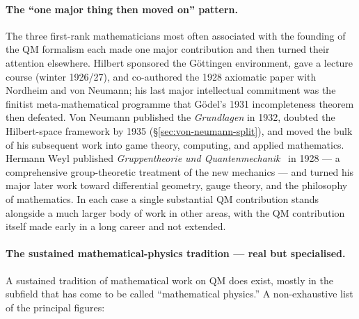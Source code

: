 \paragraph{The ``one major thing then moved on'' pattern.}
The three first-rank mathematicians most often associated with the founding of the QM formalism each made one major contribution and then turned their attention elsewhere. Hilbert sponsored the Göttingen environment, gave a lecture course (winter 1926/27), and co-authored the 1928 axiomatic paper with Nordheim and von Neumann; his last major intellectual commitment was the finitist meta-mathematical programme that Gödel's 1931 incompleteness theorem then defeated. Von Neumann published the \emph{Grundlagen} in 1932, doubted the Hilbert-space framework by 1935 (\S\ref{sec:von-neumann-split}), and moved the bulk of his subsequent work into game theory, computing, and applied mathematics. Hermann Weyl published \emph{Gruppentheorie und Quantenmechanik}~\cite{Weyl1928} in 1928 --- a comprehensive group-theoretic treatment of the new mechanics --- and turned his major later work toward differential geometry, gauge theory, and the philosophy of mathematics. In each case a single substantial QM contribution stands alongside a much larger body of work in other areas, with the QM contribution itself made early in a long career and not extended.

\paragraph{The sustained mathematical-physics tradition --- real but specialised.}
A sustained tradition of mathematical work on QM does exist, mostly in the subfield that has come to be called ``mathematical physics.'' A non-exhaustive list of the principal figures:

